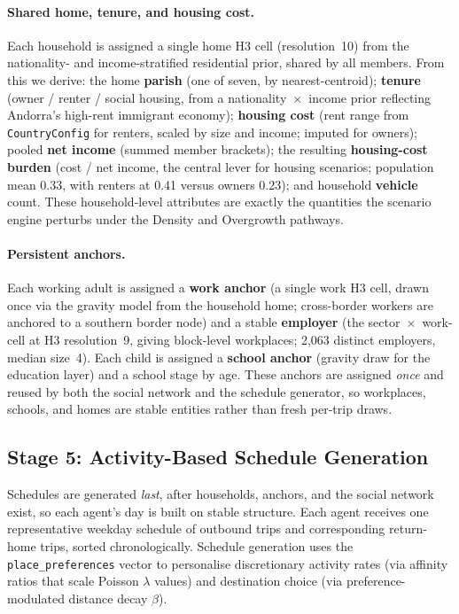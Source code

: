 \documentclass[a4paper,12pt]{article}
\begin{document}
\paragraph{Shared home, tenure, and housing cost.}
Each household is assigned a single home H3 cell (resolution~10) from the
nationality- and income-stratified residential prior, shared by all members. From
this we derive: the home \textbf{parish} (one of seven, by nearest-centroid);
\textbf{tenure} (owner / renter / social housing, from a nationality~$\times$~income
prior reflecting Andorra's high-rent immigrant economy); \textbf{housing cost}
(rent range from \texttt{CountryConfig} for renters, scaled by size and income;
imputed for owners); pooled \textbf{net income} (summed member brackets); the
resulting \textbf{housing-cost burden} (cost / net income, the central lever for
housing scenarios; population mean 0.33, with renters at 0.41 versus owners 0.23);
and household \textbf{vehicle} count. These household-level attributes are exactly
the quantities the scenario engine perturbs under the Density and Overgrowth
pathways.

\paragraph{Persistent anchors.}
Each working adult is assigned a \textbf{work anchor} (a single work H3 cell, drawn
once via the gravity model from the household home; cross-border workers are anchored
to a southern border node) and a stable \textbf{employer} (the sector~$\times$~work-cell
at H3 resolution~9, giving block-level workplaces; 2{,}063 distinct employers, median
size~4). Each child is assigned a \textbf{school anchor} (gravity draw for the
education layer) and a school stage by age. These anchors are assigned \emph{once} and
reused by both the social network and the schedule generator, so workplaces, schools,
and homes are stable entities rather than fresh per-trip draws.

\subsection{Stage 5: Activity-Based Schedule Generation}
\label{subsec:schedule_generation}

Schedules are generated \emph{last}, after households, anchors, and the social
network exist, so each agent's day is built on stable structure. Each agent receives
one representative weekday schedule of outbound trips and corresponding return-home
trips, sorted chronologically. Schedule generation uses the \texttt{place\_preferences}
vector to personalise discretionary activity rates (via affinity ratios that scale
Poisson $\lambda$ values) and destination choice (via preference-modulated distance
decay $\beta$).
\end{document}
